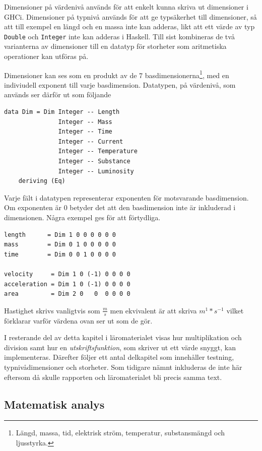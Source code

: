 Dimensioner på värdenivå används för att enkelt kunna skriva ut dimensioner i
GHCi. Dimensioner på typnivå används för att ge typsäkerhet till dimensioner, så
att till exempel en längd och en massa inte kan adderas, likt att ett värde av
typ \texttt{Double} och \texttt{Integer} inte kan adderas i Haskell. Till sist
kombineras de två varianterna av dimensioner till en datatyp för storheter som
aritmetiska operationer kan utföras på.

Dimensioner kan ses som en produkt av de 7 basdimensionerna\footnote{Längd,
massa, tid, elektrisk ström, temperatur, substansmängd och ljusstyrka.}, med en
indiviudell exponent till varje basdimension. Datatypen, på värdenivå, som
används ser därför ut som följande

\begin{lstlisting}
data Dim = Dim Integer -- Length
               Integer -- Mass
               Integer -- Time
               Integer -- Current
               Integer -- Temperature
               Integer -- Substance
               Integer -- Luminosity
    deriving (Eq)
\end{lstlisting}

Varje fält i datatypen representerar exponenten för motsvarande basdimension. Om
exponenten är $0$ betyder det att den basdimension inte är inkluderad i
dimensionen. Några exempel ges för att förtydliga.

\begin{lstlisting}
length      = Dim 1 0 0 0 0 0 0
mass        = Dim 0 1 0 0 0 0 0
time        = Dim 0 0 1 0 0 0 0

velocity     = Dim 1 0 (-1) 0 0 0 0
acceleration = Dim 1 0 (-1) 0 0 0 0
area         = Dim 2 0   0  0 0 0 0
\end{lstlisting}

Hastighet skrivs vanligtvis som $\frac{m}{s}$ men ekvivalent är att skriva
$m^1*s^{-1}$ vilket förklarar varför värdena ovan ser ut som de gör.

I resterande del av detta kapitel i läromaterialet visas hur multiplikation och
division samt hur en \textit{utskriftsfunktion}, som skriver ut ett värde
snyggt, kan implementeras. Därefter följer ett antal delkapitel som innehåller
testning, typnivådimensioner och storheter. Som tidigare nämnt inkluderas de
inte här eftersom då skulle rapporten och läromaterialet bli precis samma text.

\subsection{Matematisk analys}

